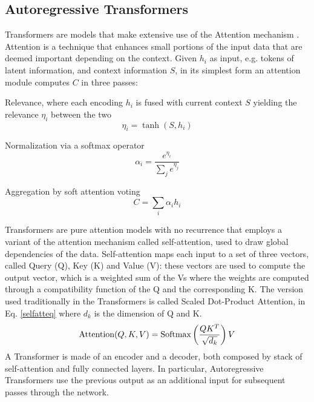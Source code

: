 \documentclass[conference]{IEEEtran}
\begin{document}
\subsection{Autoregressive Transformers}
Transformers \cite{transformer} are models that make extensive use of the Attention mechanism \cite{attention}. Attention is a technique that enhances small portions of the input data that are deemed important depending on the context. Given $h_i$ as input, e.g. tokens of latent information, and context information $S$, in its simplest form an attention module computes $C$ in three passes:
\begin{list}{-}{}
	\item Relevance, where each encoding $h_i$ is fused with current context $S$ yielding the relevance $\eta_i$ between the two
	\begin{equation}
	\eta_i = \tanh(S, h_i)
	\label{attentionrelevance}
	\end{equation}
	\item Normalization via a softmax operator
	\begin{equation}
	\alpha_i = \frac{e^{\eta_i}}{\sum_j e^{\eta_j}}
	\label{attentionnormalization}
	\end{equation}
	\item Aggregation by soft attention voting
	\begin{equation}
	C = \sum_i\alpha_ih_i
	\label{attentionaggregation}
	\end{equation}
\end{list}
Transformers are pure attention models with no recurrence that employs a variant of the attention mechanism called self-attention, used to draw global dependencies of the data. Self-attention maps each input to a set of three vectors, called Query (Q), Key (K) and Value (V): these vectors are used to compute the output vector, which is a weighted sum of the Vs where the weights are computed through a compatibility function of the Q and the corresponding K. The version used traditionally in the Transformers is called Scaled Dot-Product Attention, in Eq. \ref{selfatteq} where $d_k$ is the dimension of Q and K.
\begin{equation}
\hbox{Attention}(Q, K, V) = \hbox{Softmax}\left(\frac{QK^T}{\sqrt{d_k}}\right)V
\label{selfatteq}
\end{equation}
A Transformer is made of an encoder and a decoder, both composed by stack of self-attention and fully connected layers. In particular, Autoregressive Transformers use the previous output as an additional input for subsequent passes through the network.\\
\end{document}
